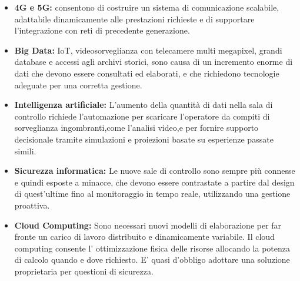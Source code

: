 \begin{itemize}
    \item \textbf{4G e 5G:} consentono di costruire un sistema di comunicazione scalabile,
    adattabile dinamicamente alle prestazioni richieste e di supportare l'integrazione con
    reti di precedente generazione.
    \item \textbf{Big Data:} IoT, videosorveglianza con telecamere multi megapixel,
    grandi database e accessi agli archivi storici, sono causa di un incremento enorme di 
    dati che devono essere consultati ed elaborati, e che richiedono
    tecnologie adeguate per una corretta gestione.
    \item \textbf{Intelligenza artificiale:} L'aumento della quantità di dati nella sala di 
    controllo richiede l'automazione per scaricare l'operatore da compiti di sorveglianza 
    ingombranti,come l'analisi video,e per fornire supporto decisionale tramite simulazioni
     e proiezioni basate su esperienze passate simili.
    \item \textbf{Sicurezza informatica:} Le nuove sale di controllo
    sono sempre più connesse e quindi esposte a minacce, che devono essere contrastate a partire 
    dal design di quest'ultime fino al monitoraggio in tempo reale, utilizzando una gestione proattiva. 
    \item \textbf{Cloud Computing:} Sono necessari nuovi modelli di elaborazione per far fronte
    un carico di lavoro distribuito e dinamicamente variabile. Il cloud computing consente l' ottimizzazione fisica
    delle risorse allocando la potenza di calcolo quando e dove richiesto.
     E' quasi d'obbligo adottare una soluzione proprietaria per questioni di sicurezza.

\end{itemize}



